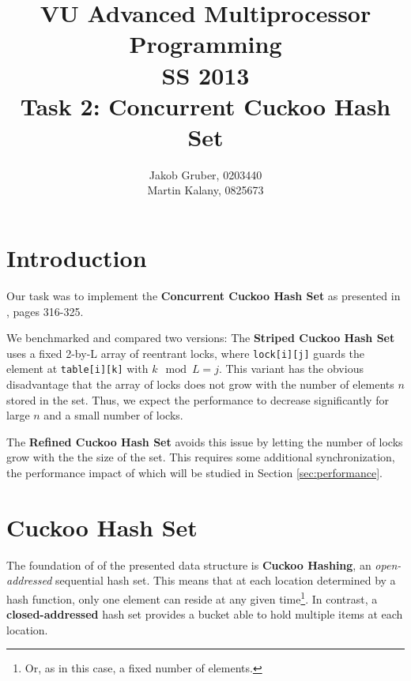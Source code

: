 \documentclass[a4paper,10pt]{article}
\title{VU Advanced Multiprocessor Programming \\
       SS 2013 \\
       Task 2: Concurrent Cuckoo Hash Set}
\author{Jakob Gruber, 0203440 \\
        Martin Kalany, 0825673}
\begin{document}
\maketitle

\begin{comment}
* Good theoretical analysis (invariants, linearizability, progress guarantees).
* Good benchmark analysis.
* Short document: 2-4 pages excluding plots and sourcecode. Description of data
  structure. Theoretical analysis. Benchmark (results, process).

+The Go implementation doesn't need either of these crutches. It's also designed
+to work without reentrant locks and thread ids.
\end{comment}

\section{Introduction}

Our task was to implement the \textbf{Concurrent Cuckoo Hash Set} as presented
in \cite{herlihy}, pages 316-325. 

We benchmarked and compared two versions: The \textbf{Striped Cuckoo Hash Set}
uses a fixed 2-by-L array of reentrant locks, where \lstinline|lock[i][j]|
guards the element at \lstinline|table[i][k]| with $k \mod L = j$. This variant
has the obvious disadvantage that the array of locks does not grow with the
number of elements $n$ stored in the set. Thus, we expect the performance to
decrease significantly for large $n$ and a small number of locks.

The \textbf{Refined Cuckoo Hash Set} avoids this issue by letting the number of
locks grow with the the size of the set. This requires some additional
synchronization, the performance impact of which will be studied in Section
\ref{sec:performance}.

\section{Cuckoo Hash Set}

The foundation of of the presented data structure is \textbf{Cuckoo Hashing},
an \textit{open-addressed} sequential hash set. This means that at each
location determined by a hash function, only one element can reside at any
given time\footnote{Or, as in this case, a fixed number of elements.}. In
contrast, a \textbf{closed-addressed} hash set provides a bucket able to hold
multiple items at each location.
\end{document}
